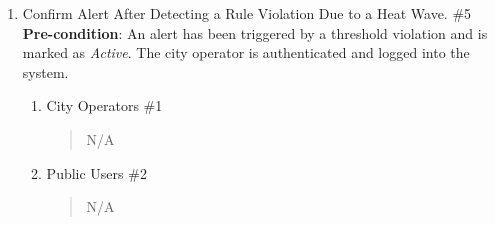 \documentclass[]{article}
\begin{document}
\begin{enumerate}[{\bf BE5.}]
	\item Confirm Alert After Detecting a Rule Violation Due to a Heat Wave. \#5 \\      
    \textbf{Pre-condition}: An alert has been triggered by a threshold violation and is marked as \textit{Active}. The city operator is authenticated and logged into the system.
    
		\begin{enumerate}[{\bf VP1.}]
			\item City Operators \#1 
                \begin{quote}
                    N/A
                \end{quote}
                
			\item Public Users \#2 
				\begin{quote}
				    N/A
				\end{quote}
                

\end{enumerate}
\end{enumerate}
\end{document}
